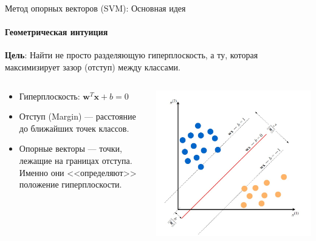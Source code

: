 \documentclass[notheorems, handout]{beamer}
\begin{document}
\begin{frame}{Метод опорных векторов (SVM): Основная идея}
	\framesubtitle{Геометрическая интуиция}

	\textbf{Цель}: Найти не просто разделяющую гиперплоскость, а ту, которая \alert{максимизирует зазор (отступ)} между классами.

	\begin{columns}
		\begin{column}{0.5\textwidth}
			\begin{itemize}
				\item Гиперплоскость: $\mathbf{w}^T \mathbf{x} + b = 0$
				\item \alert{Отступ (Margin)} — расстояние до ближайших точек классов.
				\item \alert{Опорные векторы} — точки, лежащие на границах отступа. Именно они <<определяют>> положение гиперплоскости.
			\end{itemize}
		\end{column}
		\begin{column}{0.5\textwidth}
			\includegraphics[width=\textwidth]{img/svm_margin.jpg}
		\end{column}
	\end{columns}
\end{frame}
\end{document}
